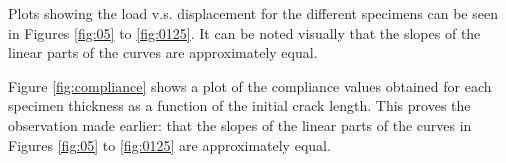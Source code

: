 Plots showing the load v.s. displacement for the different specimens can be seen in Figures \ref{fig:05} to \ref{fig:0125}. It can be noted visually that the slopes of the linear parts of the curves are approximately equal.

Figure \ref{fig:compliance} shows a plot of the compliance values obtained for each specimen thickness as a function of the initial crack length. This proves the observation made earlier: that the slopes of the linear parts of the curves in Figures \ref{fig:05} to \ref{fig:0125} are approximately equal.
